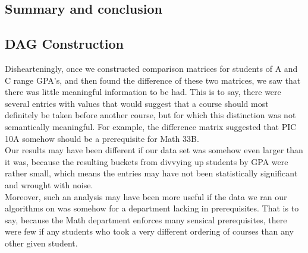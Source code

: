 \documentclass[10pt]{siamltex}
\begin{document}
\begin{pagewiselinenumbers}
\section{Summary and conclusion}  \label{sec:conclusion}
\subsection{DAG Construction}
Dishearteningly, once we constructed comparison matrices for students of A and C range GPA's, and then found the difference of these two matrices, we saw that there was little meaningful information to be had. This is to say, there were several entries with values that would suggest that a course should most definitely be taken before another course, but for which this distinction was not semantically meaningful. For example, the difference matrix suggested that PIC 10A somehow should be a prerequisite for Math 33B.\\

Our results may have been different if our data set was somehow even larger than it was, because the resulting buckets from divvying up students by GPA were rather small, which means the entries may have not been statistically significant and wrought with noise.\\

Moreover, such an analysis may have been more useful if the data we ran our algorithms on was somehow for a department lacking in prerequisites. That is to say, because the Math department enforces many sensical prerequisites, there were few if any students who took a very different ordering of courses than any other given student.



\end{pagewiselinenumbers}
\end{document}
